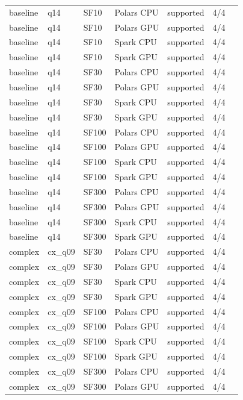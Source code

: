 \begin{longtable}{lllllll}
baseline & q14 & SF10 & Polars CPU & supported & 4/4 &  \\
baseline & q14 & SF10 & Polars GPU & supported & 4/4 &  \\
baseline & q14 & SF10 & Spark CPU & supported & 4/4 &  \\
baseline & q14 & SF10 & Spark GPU & supported & 4/4 &  \\
baseline & q14 & SF30 & Polars CPU & supported & 4/4 &  \\
baseline & q14 & SF30 & Polars GPU & supported & 4/4 &  \\
baseline & q14 & SF30 & Spark CPU & supported & 4/4 &  \\
baseline & q14 & SF30 & Spark GPU & supported & 4/4 &  \\
baseline & q14 & SF100 & Polars CPU & supported & 4/4 &  \\
baseline & q14 & SF100 & Polars GPU & supported & 4/4 &  \\
baseline & q14 & SF100 & Spark CPU & supported & 4/4 &  \\
baseline & q14 & SF100 & Spark GPU & supported & 4/4 &  \\
baseline & q14 & SF300 & Polars CPU & supported & 4/4 &  \\
baseline & q14 & SF300 & Polars GPU & supported & 4/4 &  \\
baseline & q14 & SF300 & Spark CPU & supported & 4/4 &  \\
baseline & q14 & SF300 & Spark GPU & supported & 4/4 &  \\
complex & cx\_q09 & SF30 & Polars CPU & supported & 4/4 &  \\
complex & cx\_q09 & SF30 & Polars GPU & supported & 4/4 &  \\
complex & cx\_q09 & SF30 & Spark CPU & supported & 4/4 &  \\
complex & cx\_q09 & SF30 & Spark GPU & supported & 4/4 &  \\
complex & cx\_q09 & SF100 & Polars CPU & supported & 4/4 &  \\
complex & cx\_q09 & SF100 & Polars GPU & supported & 4/4 &  \\
complex & cx\_q09 & SF100 & Spark CPU & supported & 4/4 &  \\
complex & cx\_q09 & SF100 & Spark GPU & supported & 4/4 &  \\
complex & cx\_q09 & SF300 & Polars CPU & supported & 4/4 &  \\
complex & cx\_q09 & SF300 & Polars GPU & supported & 4/4 &  \\

\end{longtable}
